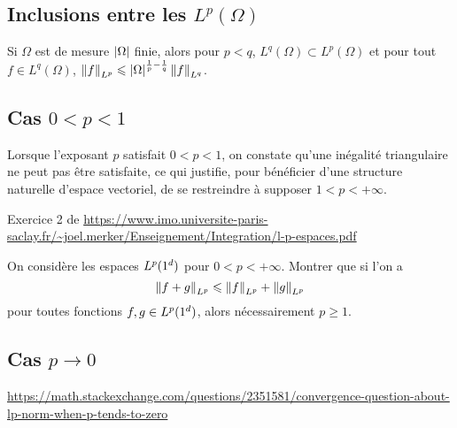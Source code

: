   
    
  
  
    
  


\subsection{Inclusions entre les $L^p(\Omega)$}

\begin{theo}{}
    Si $\Omega$ est de mesure $\left| \Omega \right|$ finie, alors pour $p<q$, $L^q(\Omega) \subset L^p(\Omega)$ et pour tout $f \in L^q(\Omega)$, $\norm{f}_{L^p} \leqslant \left| \Omega \right|^{\frac{1}{p} - \frac{1}{q}} \norm{f}_{L^q}$.
\end{theo}

\subsection{Cas $0 < p < 1$}

Lorsque l’exposant $p$ satisfait $0 < p < 1$, on constate qu’une inégalité triangulaire ne peut pas être satisfaite, ce qui justifie, pour bénéficier d’une structure naturelle
d’espace vectoriel, de se restreindre à supposer $1 < p < +\infty$. 

Exercice 2 de \url{https://www.imo.universite-paris-saclay.fr/~joel.merker/Enseignement/Integration/l-p-espaces.pdf}
\begin{exercice}
    On considère les espaces $L^p(1^d)$ pour  $0 < p < +\infty$. Montrer que si l'on a 
    \[
    \norm{f + g}_{L^p} \leqslant  \norm{f}_{L^p} + \norm{g}_{L^p}
    \]
    pour toutes fonctions $f, g \in L^p(1^d )$, alors nécessairement $p \geqslant 1$.
\end{exercice}

\subsection{Cas $p \to 0$}

\url{https://math.stackexchange.com/questions/2351581/convergence-question-about-lp-norm-when-p-tends-to-zero}